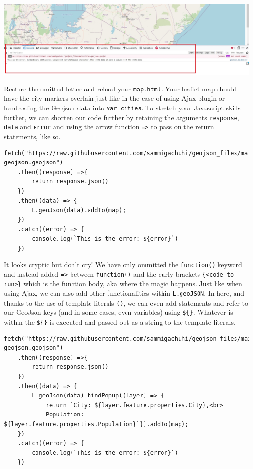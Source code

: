 \documentclass[
]{book}
\begin{document}
\includegraphics[width=26.57in]{../images/catch-error}

Restore the omitted letter and reload your \texttt{map.html}. Your leaflet map should have the city markers overlain just like in the case of using Ajax plugin or hardcoding the Geojson data into \texttt{var\ cities}. To stretch your Javascript skills further, we can shorten our code further by retaining the arguments \texttt{response}, \texttt{data} and \texttt{error} and using the arrow function \texttt{=\textgreater{}} to pass on the return statements, like so.

\begin{verbatim}
fetch("https://raw.githubusercontent.com/sammigachuhi/geojson_files/main/cities-geojson.geojson")
    .then((response) =>{
        return response.json()
    })
    .then((data) => {
        L.geoJson(data).addTo(map);
    })
    .catch((error) => {
        console.log(`This is the error: ${error}`)
    })
\end{verbatim}

It looks cryptic but don't cry! We have only ommitted the \texttt{function()} keyword and instead added \texttt{=\textgreater{}} between \texttt{function()} and the curly brackets \texttt{\{\textless{}code-to-run\textgreater{}\}} which is the function body, aka where the magic happens. Just like when using Ajax, we can also add other functionalities within \texttt{L.geoJSON}. In here, and thanks to the use of template literals \texttt{(\textasciigrave{}\textasciigrave{})}, we can even add statements and refer to our GeoJson keys (and in some cases, even variables) using \texttt{\$\{\}}. Whatever is within the \texttt{\$\{\}} is executed and passed out as a string to the template literals.

\begin{verbatim}
fetch("https://raw.githubusercontent.com/sammigachuhi/geojson_files/main/cities-geojson.geojson")
    .then((response) =>{
        return response.json()
    })
    .then((data) => {
        L.geoJson(data).bindPopup((layer) => {
            return `City: ${layer.feature.properties.City},<br>
            Population: ${layer.feature.properties.Population}`}).addTo(map);
    })
    .catch((error) => {
        console.log(`This is the error: ${error}`)
    })
\end{verbatim}
\end{document}

